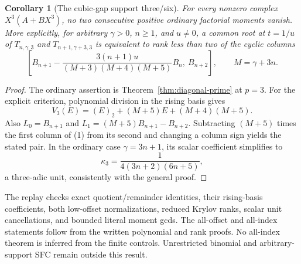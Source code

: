 \documentclass[11pt]{article}
\newtheorem{corollary}[theorem]{Corollary}
\begin{document}
\begin{corollary}[The cubic-gap support three/six]\label{cor:cubic-support}
For every nonzero complex $X^3(A+BX^3)$, no two consecutive
positive ordinary factorial moments vanish.
More explicitly, for arbitrary $\gamma>0$, $n\ge1$, and $u\ne0$,
a common root at $t=1/u$ of $T_{n,\gamma,3}$ and
$T_{n+1,\gamma+3,3}$ is equivalent to rank less than two of
the cyclic columns
\[
 \left[B_{n+1}-\frac{3(n+1)u}{(M+3)(M+4)(M+5)}B_n,\ B_{n+2}\right],
 \qquad M=\gamma+3n .
\]
\end{corollary}
\begin{proof}
The ordinary assertion is Theorem~\ref{thm:diagonal-prime} at $p=3$.
For the explicit criterion, polynomial division in the rising basis gives
\[
 V_3(E)=(E)_2+(M+5)E+(M+4)(M+5).
\]
Also $L_0=B_{n+1}$ and
$L_1=(M+5)B_{n+1}-B_{n+2}$.
Subtracting $(M+5)$ times the first column of (1) from its
second and changing a column sign yields the stated pair.
In the ordinary case $\gamma=3n+1$, its scalar coefficient simplifies to
\[
 \kappa_3=\frac1{4(3n+2)(6n+5)},
\]
a three-adic unit, consistently with the general proof.
\end{proof}

The replay checks exact quotient/remainder identities, their
rising-basis coefficients, both low-offset normalizations, reduced
Krylov ranks, scalar unit cancellations, and bounded literal moment
gcds. The all-offset and all-index statements follow from the
written polynomial and rank proofs. No all-index theorem is inferred
from the finite controls. Unrestricted binomial and arbitrary-support
SFC remain outside this result.
\end{document}
